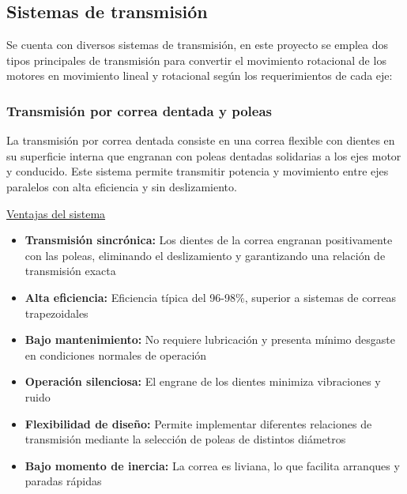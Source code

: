 
\subsection{Sistemas de transmisión}

Se cuenta con diversos sistemas de transmisión, en este proyecto se emplea dos tipos principales de transmisión para convertir el movimiento rotacional de los motores en movimiento lineal y rotacional según los requerimientos de cada eje:

\subsubsection{Transmisión por correa dentada y poleas}

La transmisión por correa dentada consiste en una correa flexible con dientes en su superficie interna que engranan con poleas dentadas solidarias a los ejes motor y conducido. Este sistema permite transmitir potencia y movimiento entre ejes paralelos con alta eficiencia y sin deslizamiento.

\underline{Ventajas del sistema}
\begin{itemize}[label=$\bullet$]
    \item \textbf{Transmisión sincrónica:} Los dientes de la correa engranan positivamente con las poleas, eliminando el deslizamiento y garantizando una relación de transmisión exacta
    \item \textbf{Alta eficiencia:} Eficiencia típica del 96-98\%, superior a sistemas de correas trapezoidales
    \item \textbf{Bajo mantenimiento:} No requiere lubricación y presenta mínimo desgaste en condiciones normales de operación
    \item \textbf{Operación silenciosa:} El engrane de los dientes minimiza vibraciones y ruido
    \item \textbf{Flexibilidad de diseño:} Permite implementar diferentes relaciones de transmisión mediante la selección de poleas de distintos diámetros
    \item \textbf{Bajo momento de inercia:} La correa es liviana, lo que facilita arranques y paradas rápidas
\end{itemize}

